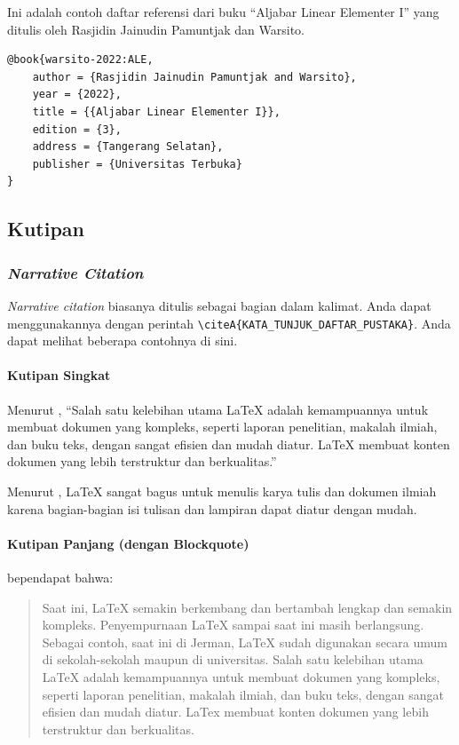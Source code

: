 Ini adalah contoh daftar referensi dari buku ``Aljabar Linear Elementer I'' yang ditulis oleh Rasjidin Jainudin Pamuntjak dan Warsito.

\begin{lstlisting}
@book{warsito-2022:ALE,
    author = {Rasjidin Jainudin Pamuntjak and Warsito},
    year = {2022},
    title = {{Aljabar Linear Elementer I}},
    edition = {3},
    address = {Tangerang Selatan},
    publisher = {Universitas Terbuka}
}
\end{lstlisting}

\subsection{Kutipan}

\subsubsection{\textit{Narrative Citation}}

\textit{Narrative citation} biasanya ditulis sebagai bagian dalam kalimat. Anda dapat menggunakannya dengan perintah \verb|\citeA{KATA_TUNJUK_DAFTAR_PUSTAKA}|. Anda dapat melihat beberapa contohnya di sini.

\paragraph{Kutipan Singkat}

Menurut , ``Salah satu kelebihan utama LaTeX adalah kemampuannya untuk membuat dokumen yang kompleks, seperti laporan penelitian, makalah ilmiah, dan buku teks, dengan sangat efisien dan mudah diatur. LaTeX membuat konten dokumen yang lebih terstruktur dan berkualitas.''

Menurut , LaTeX sangat bagus untuk menulis karya tulis dan dokumen ilmiah karena bagian-bagian isi tulisan dan lampiran dapat diatur dengan mudah.

\paragraph{Kutipan Panjang (dengan Blockquote)}

 bependapat bahwa:

\begin{quote}
    Saat ini, LaTeX semakin berkembang dan bertambah lengkap dan semakin kompleks. Penyempurnaan LaTeX sampai saat ini masih berlangsung. Sebagai contoh, saat ini di Jerman, LaTeX sudah digunakan secara umum di sekolah-sekolah maupun di universitas. Salah satu kelebihan utama LaTeX adalah kemampuannya untuk membuat dokumen yang kompleks, seperti laporan penelitian, makalah ilmiah, dan buku teks, dengan sangat efisien dan mudah diatur. LaTex membuat konten dokumen yang lebih terstruktur dan berkualitas.
\end{quote}

